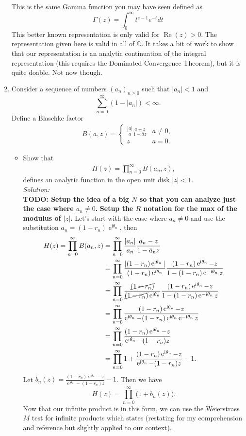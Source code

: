 \documentclass[10pt]{amsart}
\newcommand{\I}{\mathrm{i}}
\DeclareMathOperator{\E}{e}
\theoremstyle{nonumberplain}
\begin{document}
\begin{enumerate}[label={\bf {\arabic*}:}]
\noindent
This is the same Gamma function you may have seen defined as
$$
\Gamma(z)=\int_0^{\infty} t^{z-1} e^{-t} d t
$$
This better known representation is only valid for
$\operatorname{Re}(z)>0$. The representation given here is valid in
all of $\mathbb{C}$. It takes a bit of work to show that our
representation is an analytic continuation of the integral
representation (this requires the Dominated Convergence Theorem), but
it is quite doable. Not now though. \\
\newpage

\item Consider a sequence of numbers $(a_n)_{n \geq 0}$ such that $|a_n| < 1$ and
$$ \sum_{n = 0}^\infty (1 - |a_n|) < \infty. $$
Define a Blaschke factor
\begin{align*}
B(a,z) =
	\begin{cases}
		\frac{|a|}{a} \frac{ a - z}{ 1 - \bar a z} & a \neq 0,\\
  		z & a  =0.
  	\end{cases}
\end{align*}
\begin{itemize}
\item Show that
\begin{align*}
H(z) = \prod_{n=0}^\infty B(a_n,z),
\end{align*}
defines an analytic function in the open unit disk $|z| < 1$. \\
\textit{Solution:} \\
\textbf{TODO: Setup the idea of a big $N$ so that you can analyze just the case where $a_n \neq 0$.}
\textbf{Setup the $R$ notation for the max of the modulus of $|z|$.}
Let's start with the case where $a_n \neq 0$ and use the substitution $a_n = (1 - r_n)\E^{\I \theta_n}$, then
\begin{align*}
H(z) = \prod_{n=0}^\infty B(a_n,z)
	&= \prod_{n=0}^\infty \frac{|a_n|}{a_n} \frac{ a_n - z}{ 1 - \bar a_n z} \\
	&= \prod_{n=0}^\infty \frac{|(1 - r_n)\E^{\I \theta_n}|}{(1 - r_n)\E^{\I \theta_n}} \frac{ (1 - r_n)\E^{\I \theta_n} - z}{ 1 - (1 - r_n)\E^{-\I \theta_n} z} \\
	&= \prod_{n=0}^\infty \frac{\cancel{(1 - r_n)}}{\cancel{(1 - r_n)}\E^{\I \theta_n}} \frac{ (1 - r_n)\E^{\I \theta_n} - z}{ 1 -(1 - r_n)\E^{-\I \theta_n} z} \\
	&= \prod_{n=0}^\infty \frac{ (1 - r_n)\E^{\I \theta_n} - z}{ \E^{\I \theta_n} - (1 - r_n)\E^{\I \theta_n}\E^{-\I \theta_n} z} \\
	&= \prod_{n=0}^\infty \frac{ (1 - r_n)\E^{\I \theta_n} - z}{ \E^{\I \theta_n} - (1 - r_n) z} \\
	&= \prod_{n=0}^\infty 1 + \frac{ (1 - r_n)\E^{\I \theta_n} - z}{ \E^{\I \theta_n} - (1 - r_n) z} - 1.
\end{align*}
Let $b_n(z) = \frac{ (1 - r_n)\E^{\I \theta_n} - z}{ \E^{\I \theta_n} - (1 - r_n) z} - 1$.
Then we have 
$$
H(z) = \prod_{n=0}^\infty \big(1 + b_n(z)\big).
$$
Now that our infinite product is in this form, we can use the Weierstrass $M$ test for infinite products which states (restating for my comprehension and reference but slightly applied to our context). \\


\end{itemize}
\end{enumerate}
\end{document}
